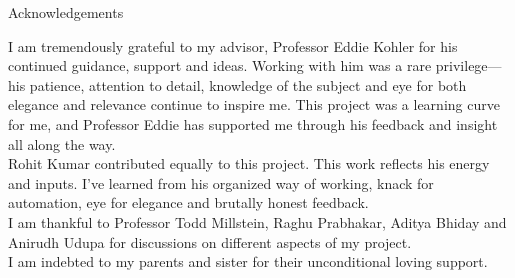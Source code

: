 \begin{center}
{\large Acknowledgements}
\end{center}

I am tremendously grateful to my advisor, Professor Eddie Kohler for
his continued guidance, support and ideas. Working with him was a rare privilege---his patience, attention to detail, knowledge of the subject and eye for both elegance and relevance continue to inspire me. This project was a learning curve for me, and Professor Eddie has supported me
through his feedback and insight all along the way.\\

Rohit Kumar contributed equally to this project. This work reflects his energy and inputs. I've learned from his organized way of working, knack for automation, eye for elegance and brutally honest feedback.\\

I am thankful to Professor Todd Millstein, Raghu Prabhakar, Aditya Bhiday and Anirudh Udupa for discussions on different aspects of my project.\\

I am indebted to my parents and sister for their unconditional loving support.

